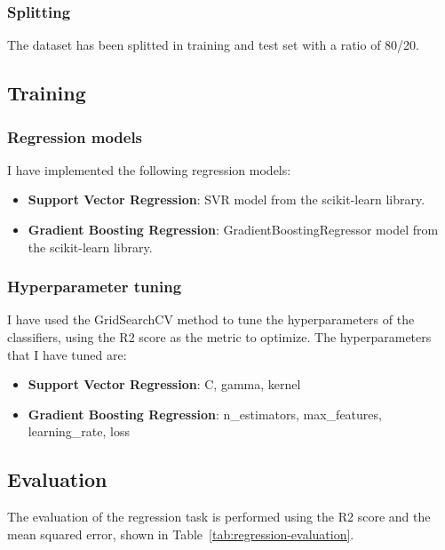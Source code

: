 \subsubsection{Splitting} \label{sec:preprocessing-splitting-regression}
The dataset has been splitted in training and test set with a ratio of 80/20.

\subsection{Training} \label{sec:training-regression}

\subsubsection{Regression models} \label{sec:training-regression-models-regression}
I have implemented the following regression models:
\begin{itemize}
    \item \textbf{Support Vector Regression}: SVR model from the scikit-learn library.
    \item \textbf{Gradient Boosting Regression}: GradientBoostingRegressor model from the scikit-learn library.
\end{itemize}

\subsubsection{Hyperparameter tuning} \label{sec:training-hyperparameter-tuning-regression}
I have used the GridSearchCV method to tune the hyperparameters of the classifiers, using the R2 score as the metric to optimize.
The hyperparameters that I have tuned are:
\begin{itemize}
    \item \textbf{Support Vector Regression}: C, gamma, kernel
    \item \textbf{Gradient Boosting Regression}: n\_estimators, max\_features, learning\_rate, loss
\end{itemize}

\subsection{Evaluation}
The evaluation of the regression task is performed using the R2 score and the mean squared error, shown in Table~\ref{tab:regression-evaluation}.

